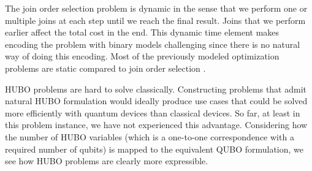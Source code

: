 The join order selection problem is dynamic in the sense that we perform one or multiple joins at each step until we reach the final result. Joins that we perform earlier affect the total cost in the end. This dynamic time element makes encoding the problem with binary models challenging since there is no natural way of doing this encoding. Most of the previously modeled optimization problems are static compared to join order selection \cite{lucas}.

HUBO problems are hard to solve classically. Constructing problems that admit natural HUBO formulation would ideally produce use cases that could be solved more efficiently with quantum devices than classical devices. So far, at least in this problem instance, we have not experienced this advantage. Considering how the number of HUBO variables (which is a one-to-one correspondence with a required number of qubits) is mapped to the equivalent QUBO formulation, we see how HUBO problems are clearly more expressible.